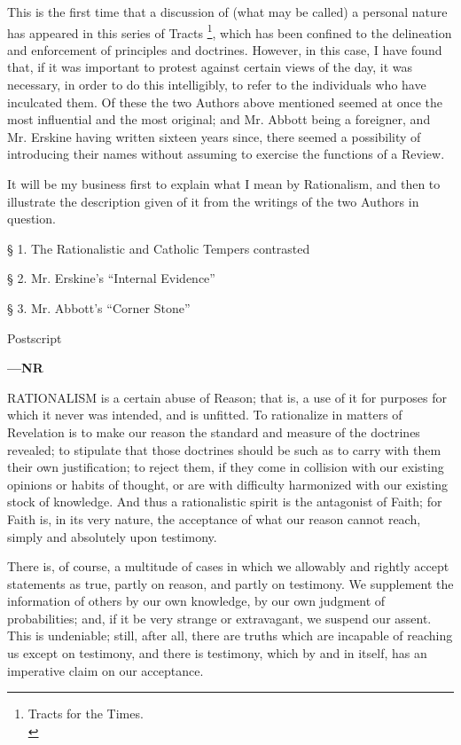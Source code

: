 This is the first time that a discussion of (what
may be called) a personal nature has appeared in this series of Tracts
\footnote{Tracts for the Times.\textbf{}\\}, which has been confined to
the delineation and enforcement of principles and doctrines. However,
in this case, I have found that, if it was important to protest
against certain views of the day, it was necessary, in order to do
this intelligibly, to refer to the individuals who have inculcated
them. Of these the two Authors above mentioned seemed at once the most
influential and the most original; and Mr. Abbott being a foreigner,
and Mr. Erskine having written sixteen years since, there seemed a
possibility of introducing their names without assuming to exercise
the functions of a Review.

It will be my business first to explain what I
mean by Rationalism, and then to illustrate the description given of
it from the writings of the two Authors in question.

§ 1.
The Rationalistic and Catholic Tempers
contrasted

§ 2.
Mr. Erskine's ``Internal
Evidence''

§ 3.
Mr. Abbott's ``Corner Stone''

Postscript

\textbf{—NR}


RATIONALISM
is a certain abuse of Reason; that is, a use of it for purposes for
which it never was intended, and is unfitted. To rationalize in
matters of Revelation is to make our reason the standard and measure
of the doctrines revealed; to stipulate that those doctrines should be
such as to carry with them their own justification; to reject them, if
they come in collision with our existing opinions or habits of
thought, or are with difficulty harmonized with our existing stock of
knowledge. And thus a rationalistic spirit is the antagonist of Faith;
for Faith is, in its very nature, the acceptance of what our reason
cannot reach, simply and absolutely upon testimony.

There is, of course, a multitude of cases in
which we allowably and rightly accept statements as true, partly on
reason, and partly on testimony. We supplement the information of
others by our own knowledge, by our own judgment of probabilities;
and, if it be very strange or extravagant, we suspend our assent. This
is undeniable; still, after all, there are truths which are incapable
of reaching us except on testimony, and there is testimony, which by
and in itself, has an imperative claim on our acceptance.

